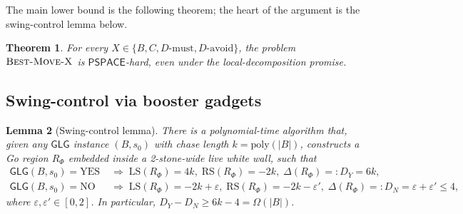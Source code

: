 \documentclass[11pt,a4paper]{amsart}
\newtheorem{theorem}{Theorem}[section]
\newtheorem{lemma}[theorem]{Lemma}
\theoremstyle{definition}
\theoremstyle{remark}
\newcommand{\LS}{\mathrm{LS}}
\newcommand{\RS}{\mathrm{RS}}
\newcommand{\PSPACE}{\mathsf{PSPACE}}
\newcommand{\GLG}{\mathsf{GLG}}
\newcommand{\BMX}{\textsc{Best-Move-X}}
\begin{document}
The main lower bound is the following theorem; the heart of the argument
is the swing-control lemma below.

\begin{theorem}\label{thm:main}
For every $X \in \{B, C, D\text{-must}, D\text{-avoid}\}$, the problem
$\BMX$ is $\PSPACE$-hard, even under the local-decomposition promise.
\end{theorem}

\subsection{Swing-control via booster gadgets}

\begin{lemma}[Swing-control lemma]\label{lem:swing}
There is a polynomial-time algorithm that, given any $\GLG$ instance
$(B, s_0)$ with chase length $k = \mathrm{poly}(|B|)$, constructs a Go
region $R_\Phi$ embedded inside a 2-stone-wide live white wall, such that
\begin{align*}
  \GLG(B, s_0) = \mathrm{YES}
   &\;\Longrightarrow\; \LS(R_\Phi) = 4k,\;
   \RS(R_\Phi) = -2k, \;\Delta(R_\Phi) =: D_Y = 6k,
   \\
  \GLG(B, s_0) = \mathrm{NO}
   &\;\Longrightarrow\; \LS(R_\Phi) = -2k + \varepsilon,\;
   \RS(R_\Phi) = -2k - \varepsilon',
   \;\Delta(R_\Phi) =: D_N = \varepsilon + \varepsilon' \leq 4,
\end{align*}
where $\varepsilon, \varepsilon' \in [0, 2]$. In particular,
$D_Y - D_N \geq 6k - 4 = \Omega(|B|)$.
\end{lemma}
\end{document}
